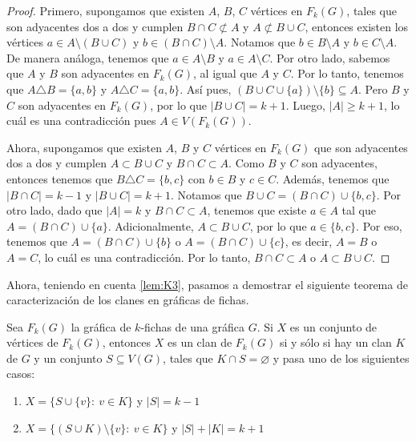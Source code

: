 \begin{proof}
    Primero, supongamos que existen $A$, $B$, $C$ v\'ertices en $F_k(G)$, tales
    que son adyacentes dos a dos y cumplen $B \cap C \not\subset A$ y $A
    \not\subset B \cup C$, entonces existen los v\'ertices  $a \in A \setminus
    (B \cup C)$ y $b \in (B \cap C)\setminus A$. Notamos que $b \in B \setminus
    A$ y $b \in C \setminus A$. De manera an\'aloga, tenemos que $a \in A
    \setminus B$ y $a \in A \setminus C$. Por otro lado, sabemos que $A$ y $B$
    son adyacentes en $F_k(G)$, al igual que $A$ y $C$. Por lo tanto, tenemos
    que $A \triangle B = \{a,b\}$ y $A \triangle C = \{a, b\}$. As\'i pues, $(B
    \cup C \cup \{a\})\setminus \{b\} \subseteq A$. Pero $B$ y $C$ son
    adyacentes en $F_k(G)$, por lo que $|B \cup C| = k+1$. Luego, $|A| \geq
    k+1$, lo cu\'al es una contradicci\'on pues $A \in V (F_k(G))$. 

    Ahora, supongamos que existen $A$, $B$ y $C$ v\'ertices en $F_k(G)$ que son
    adyacentes dos a dos y cumplen $A \subset B \cup C$ y $B \cap C \subset A$.
    Como $B$ y $C$ son adyacentes, entonces tenemos que $B \triangle C =
    \{b,c\}$ con $b \in B$ y $c \in C$. Adem\'as, tenemos que $|B \cap C| = k-1$
    y $|B \cup C| = k +1$. Notamos que $B \cup C = (B\cap C) \cup \{b,c\}$. Por
    otro lado, dado que $|A|=k$ y $B \cap C \subset A$, tenemos que existe $a
    \in A$ tal que $A = (B \cap C) \cup \{a\}$. Adicionalmente, $A \subset B
    \cup C$, por lo que $a \in \{b, c\}$. Por eso, tenemos que $A = (B \cap C)
    \cup \{b\}$ o $A = (B \cap C) \cup \{c\}$, es decir, $A = B$ o $A=C$, lo
    cu\'al es una contradicci\'on. Por lo tanto, $B \cap C \subset A$ o $A
    \subset B \cup C$.
\end{proof}

Ahora, teniendo en cuenta \cref{lem:K3}, pasamos a demostrar el siguiente
teorema de caracterizaci\'on de los clanes en gr\'aficas de fichas.

\begin{teorema}
\label{teo:clanG-clanFG}
    Sea $F_k(G)$ la gr\'afica de $k$-fichas de una gr\'afica $G$. Si $X$ es un
    conjunto de v\'ertices de $F_k(G)$, entonces $X$ es un clan de $F_k(G)$ si y
    s\'olo si hay un clan $K$ de $G$ y un conjunto $S \subseteq V(G)$, tales que
    $K \cap S = \varnothing$ y pasa uno de los siguientes casos:
        \begin{enumerate}
            \item $X = \{S \cup \{v\}\colon\ v \in K\}$ y $|S| = k-1$
            \item $X = \{(S\cup K) \setminus \{v\}\colon\ v \in K \}$ y $|S| +
            |K| = k+1$
        \end{enumerate}
\end{teorema}

